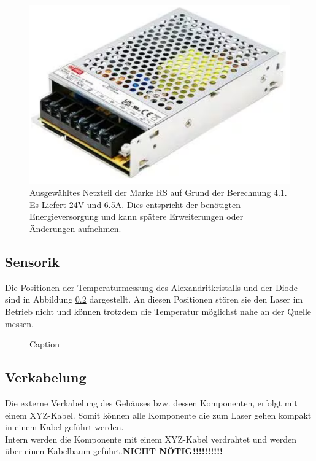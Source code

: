 \begin{figure}[H]
    \centering
    \includegraphics[scale=0.7]{98_images/controller_ps.PNG}
    \caption{Ausgewähltes Netzteil der Marke RS auf Grund der Berechnung 4.1. Es Liefert 24V und 6.5A. Dies entspricht der benötigten Energieversorgung und kann spätere Erweiterungen oder Änderungen aufnehmen.}
    \label{fig:enter-label}
\end{figure}

\subsection{Sensorik}
Die Positionen der Temperaturmessung des Alexandritkristalls und der Diode sind in Abbildung \ref{} dargestellt. An diesen Positionen stören sie den Laser im Betrieb nicht und können trotzdem die Temperatur möglichst nahe an der Quelle messen.

\begin{figure}
    \centering
    \caption{Caption}
    \label{fig:enter-label}
\end{figure}

\subsection{Verkabelung}  %
Die externe Verkabelung des Gehäuses bzw. dessen Komponenten, erfolgt mit einem XYZ-Kabel. Somit können alle Komponente die zum Laser gehen kompakt in einem Kabel geführt werden.\\
Intern werden die Komponente mit einem XYZ-Kabel verdrahtet und werden über einen Kabelbaum geführt.\textbf{NICHT NÖTIG!!!!!!!!!!}\\

